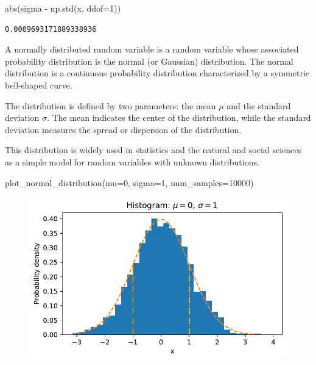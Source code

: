 \documentclass[
  letterpaper,
  DIV=11,
  numbers=noendperiod]{scrreprt}
\newenvironment{Shaded}{\begin{snugshade}}{\end{snugshade}}
\newcommand{\BuiltInTok}[1]{\textcolor[rgb]{0.00,0.23,0.31}{#1}}
\newcommand{\DecValTok}[1]{\textcolor[rgb]{0.68,0.00,0.00}{#1}}
\newcommand{\NormalTok}[1]{\textcolor[rgb]{0.00,0.23,0.31}{#1}}
\newcommand{\OperatorTok}[1]{\textcolor[rgb]{0.37,0.37,0.37}{#1}}
\begin{document}
\begin{Shaded}
\begin{Highlighting}[]
\BuiltInTok{abs}\NormalTok{(sigma }\OperatorTok{{-}}\NormalTok{ np.std(x, ddof}\OperatorTok{=}\DecValTok{1}\NormalTok{))}
\end{Highlighting}
\end{Shaded}

\begin{verbatim}
0.0009693171889338936
\end{verbatim}

A normally distributed random variable is a random variable whose
associated probability distribution is the normal (or Gaussian)
distribution. The normal distribution is a continuous probability
distribution characterized by a symmetric bell-shaped curve.

The distribution is defined by two parameters: the mean \(\mu\) and the
standard deviation \(\sigma\). The mean indicates the center of the
distribution, while the standard deviation measures the spread or
dispersion of the distribution.

This distribution is widely used in statistics and the natural and
social sciences as a simple model for random variables with unknown
distributions.

\begin{Shaded}
\begin{Highlighting}[]
\NormalTok{plot\_normal\_distribution(mu}\OperatorTok{=}\DecValTok{0}\NormalTok{, sigma}\OperatorTok{=}\DecValTok{1}\NormalTok{, num\_samples}\OperatorTok{=}\DecValTok{10000}\NormalTok{)}
\end{Highlighting}
\end{Shaded}

\begin{figure}[H]

{\centering \includegraphics{006_num_gp_files/figure-pdf/cell-20-output-1.pdf}

}

\end{figure}
\end{document}
